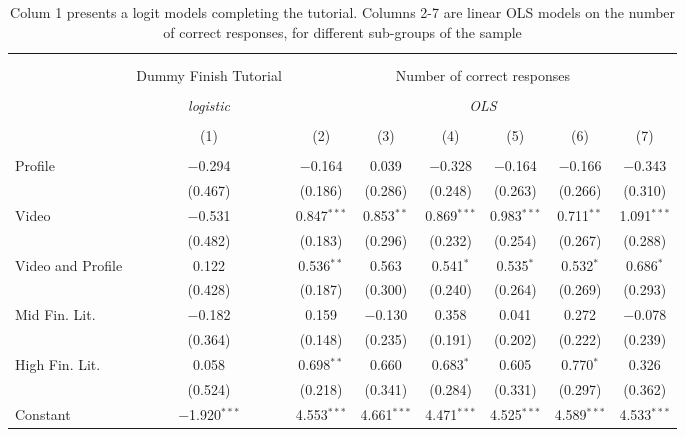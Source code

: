 
\begin{table}[H] \centering 
  \caption{Colum 1 presents a logit models completing the tutorial. Columns 2-7 are linear OLS models on the number
            of correct responses, for different sub-groups of the sample} 
  \label{tbl:Main_results_correct_response} 
\begin{tabular}{@{\extracolsep{5pt}}lccccccc} 
\\[-1.8ex]\hline 
\hline \\[-1.8ex] 
\\[-1.8ex] & Dummy Finish Tutorial & \multicolumn{6}{c}{Number of correct responses} \\ 
\\[-1.8ex] & \textit{logistic} & \multicolumn{6}{c}{\textit{OLS}} \\ 
\\[-1.8ex] & (1) & (2) & (3) & (4) & (5) & (6) & (7)\\ 
\hline \\[-1.8ex] 
 Profile & $-$0.294 & $-$0.164 & 0.039 & $-$0.328 & $-$0.164 & $-$0.166 & $-$0.343 \\ 
  & (0.467) & (0.186) & (0.286) & (0.248) & (0.263) & (0.266) & (0.310) \\ 
  Video & $-$0.531 & 0.847$^{***}$ & 0.853$^{**}$ & 0.869$^{***}$ & 0.983$^{***}$ & 0.711$^{**}$ & 1.091$^{***}$ \\ 
  & (0.482) & (0.183) & (0.296) & (0.232) & (0.254) & (0.267) & (0.288) \\ 
  Video and Profile & 0.122 & 0.536$^{**}$ & 0.563 & 0.541$^{*}$ & 0.535$^{*}$ & 0.532$^{*}$ & 0.686$^{*}$ \\ 
  & (0.428) & (0.187) & (0.300) & (0.240) & (0.264) & (0.269) & (0.293) \\ 
  Mid Fin. Lit. & $-$0.182 & 0.159 & $-$0.130 & 0.358 & 0.041 & 0.272 & $-$0.078 \\ 
  & (0.364) & (0.148) & (0.235) & (0.191) & (0.202) & (0.222) & (0.239) \\ 
  High Fin. Lit. & 0.058 & 0.698$^{**}$ & 0.660 & 0.683$^{*}$ & 0.605 & 0.770$^{*}$ & 0.326 \\ 
  & (0.524) & (0.218) & (0.341) & (0.284) & (0.331) & (0.297) & (0.362) \\ 
  Constant & $-$1.920$^{***}$ & 4.553$^{***}$ & 4.661$^{***}$ & 4.471$^{***}$ & 4.525$^{***}$ & 4.589$^{***}$ & 4.533$^{***}$ \\ 

\end{tabular}
\end{table}

